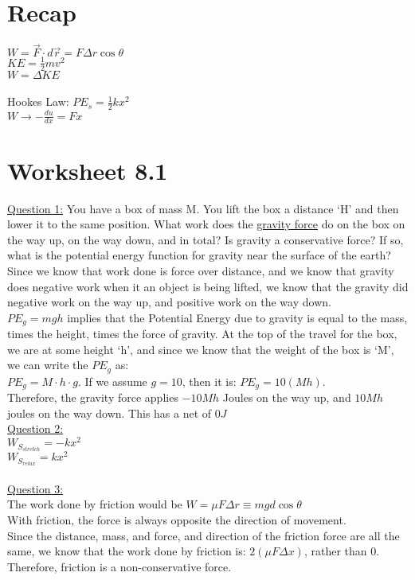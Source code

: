 \documentclass[]{article}
\date{}
\title{\docTitle}
\author{\docAuthor}
\date{\today}
\begin{document}
\maketitle

\section*{Recap}
$W = \vec{F}\cdot d\vec{r} = F\Delta r \cos \theta$\\
$KE = \frac{1}{2}mv^2$\\
$W = \Delta KE$\\
\\
Hookes Law:
$PE_s = \frac{1}{2}kx^2$\\
$W \rightarrow -\frac{du}{dx} = Fx$\\

\section*{Worksheet 8.1}
\underline{Question 1:} You have a box of mass M. You lift the box a distance `H' and then lower it to the same position. What work does the \underline{gravity force} do on the box on the way up, on the way down, and in total? Is gravity a conservative force? If so, what is the potential energy function for gravity near the surface of the earth?\\
Since we know that work done is force over distance, and we know that gravity does negative work when it an object is being lifted, we know that the gravity did negative work on the way up, and positive work on the way down.\\
$PE_g = mgh$ implies that the Potential Energy due to gravity is equal to the mass, times the height, times the force of gravity. At the top of the travel for the box, we are at some height `h', and since we know that the weight of the box is `M', we can write the $PE_g$ as:\\
$PE_g = M \cdot h \cdot g$. If we assume $g = 10$, then it is: $PE_g = 10(Mh)$.\\
Therefore, the gravity force applies $-10Mh$ Joules on the way up, and $10Mh$ joules on the way down. This has a net of $0 J$
\\
\underline{Question 2:}\\
$W_{S_{stretch}} = -kx^2$\\
$W_{S_{relax}} = kx^2$\\
\\
\underline{Question 3:}\\
The work done by friction would be $W = \mu F \Delta r \equiv mg d \cos \theta$\\
With friction, the force is always opposite the direction of movement.\\
Since the distance, mass, and force, and direction of the friction force are all the same, we know that the work done by friction is: $2 (\mu F \Delta x)$, rather than $0$.\\
Therefore, friction is a non-conservative force.
\end{document}
